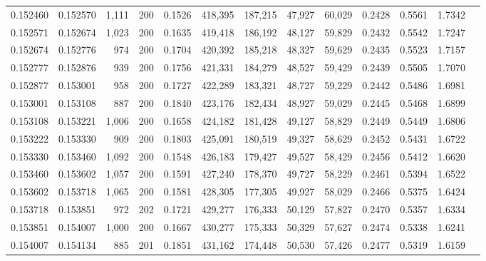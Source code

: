 \begin{tabular}{rrrrrrrrrrrrr}
0.152460 & 0.152570 & 1,111 & 200 &                                     0.1526 & 418,395 & 187,215 &  47,927 &  60,029 & 0.2428 & 0.5561 & 1.7342 \\
0.152571 & 0.152674 & 1,023 & 200 &                                     0.1635 & 419,418 & 186,192 &  48,127 &  59,829 & 0.2432 & 0.5542 & 1.7247 \\
0.152674 & 0.152776 &   974 & 200 &                                     0.1704 & 420,392 & 185,218 &  48,327 &  59,629 & 0.2435 & 0.5523 & 1.7157 \\
0.152777 & 0.152876 &   939 & 200 &                                     0.1756 & 421,331 & 184,279 &  48,527 &  59,429 & 0.2439 & 0.5505 & 1.7070 \\
0.152877 & 0.153001 &   958 & 200 &                                     0.1727 & 422,289 & 183,321 &  48,727 &  59,229 & 0.2442 & 0.5486 & 1.6981 \\
0.153001 & 0.153108 &   887 & 200 &                                     0.1840 & 423,176 & 182,434 &  48,927 &  59,029 & 0.2445 & 0.5468 & 1.6899 \\
0.153108 & 0.153221 & 1,006 & 200 &                                     0.1658 & 424,182 & 181,428 &  49,127 &  58,829 & 0.2449 & 0.5449 & 1.6806 \\
0.153222 & 0.153330 &   909 & 200 &                                     0.1803 & 425,091 & 180,519 &  49,327 &  58,629 & 0.2452 & 0.5431 & 1.6722 \\
0.153330 & 0.153460 & 1,092 & 200 &                                     0.1548 & 426,183 & 179,427 &  49,527 &  58,429 & 0.2456 & 0.5412 & 1.6620 \\
0.153460 & 0.153602 & 1,057 & 200 &                                     0.1591 & 427,240 & 178,370 &  49,727 &  58,229 & 0.2461 & 0.5394 & 1.6522 \\
0.153602 & 0.153718 & 1,065 & 200 &                                     0.1581 & 428,305 & 177,305 &  49,927 &  58,029 & 0.2466 & 0.5375 & 1.6424 \\
0.153718 & 0.153851 &   972 & 202 &                                     0.1721 & 429,277 & 176,333 &  50,129 &  57,827 & 0.2470 & 0.5357 & 1.6334 \\
0.153851 & 0.154007 & 1,000 & 200 &                                     0.1667 & 430,277 & 175,333 &  50,329 &  57,627 & 0.2474 & 0.5338 & 1.6241 \\
0.154007 & 0.154134 &   885 & 201 &                                     0.1851 & 431,162 & 174,448 &  50,530 &  57,426 & 0.2477 & 0.5319 & 1.6159 \\

\end{tabular}
